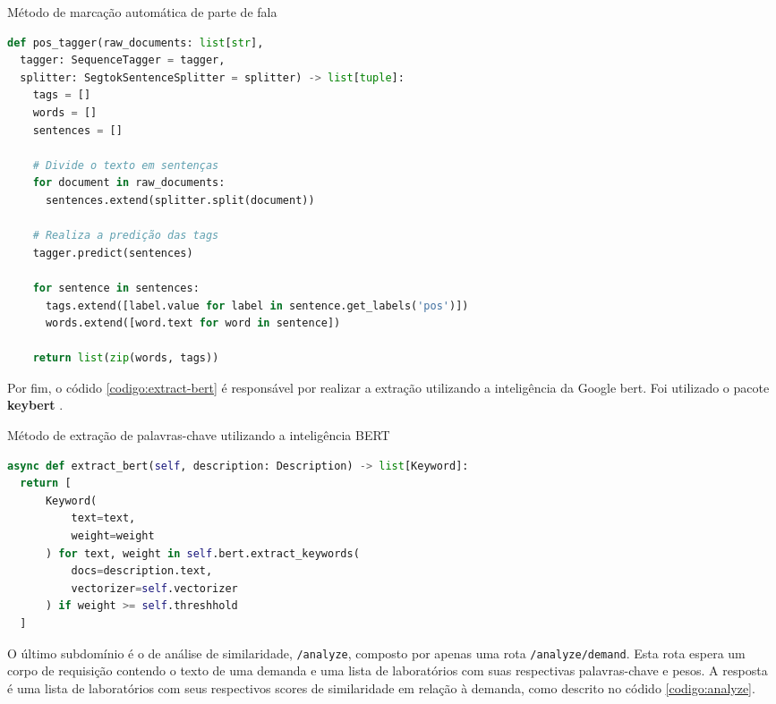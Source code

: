 \begin{sourcecode}[H]
  \caption{\label{codigo:pos-tagger}Método de marcação automática de parte de fala}
  \begin{lstlisting}[frame=single, language=Python]
def pos_tagger(raw_documents: list[str], 
  tagger: SequenceTagger = tagger, 
  splitter: SegtokSentenceSplitter = splitter) -> list[tuple]:
    tags = []
    words = []
    sentences = []

    # Divide o texto em sentenças
    for document in raw_documents:
      sentences.extend(splitter.split(document))

    # Realiza a predição das tags
    tagger.predict(sentences)

    for sentence in sentences:
      tags.extend([label.value for label in sentence.get_labels('pos')])
      words.extend([word.text for word in sentence])

    return list(zip(words, tags))
\end{lstlisting}
  \fonte{}
\end{sourcecode}

Por fim, o códido \ref{codigo:extract-bert} é responsável por realizar a extração utilizando a inteligência da Google \gls{bert}. Foi utilizado o pacote \textbf{keybert} \cite{grootendorst2020keybert}.

\begin{sourcecode}[H]
  \caption{\label{codigo:extract-bert}Método de extração de palavras-chave utilizando a inteligência BERT}
  \begin{lstlisting}[frame=single, language=Python]
async def extract_bert(self, description: Description) -> list[Keyword]:
  return [
      Keyword(
          text=text, 
          weight=weight
      ) for text, weight in self.bert.extract_keywords(
          docs=description.text, 
          vectorizer=self.vectorizer
      ) if weight >= self.threshhold
  ]
\end{lstlisting}
  \fonte{}
\end{sourcecode}

O último subdomínio é o de análise de similaridade, \texttt{/analyze}, composto por apenas uma rota \texttt{/analyze/demand}. Esta rota espera um corpo de requisição contendo o texto de uma demanda e uma lista de laboratórios com suas respectivas palavras-chave e pesos. A resposta é uma lista de laboratórios com seus respectivos scores de similaridade em relação à demanda, como descrito no códido \ref{codigo:analyze}.

